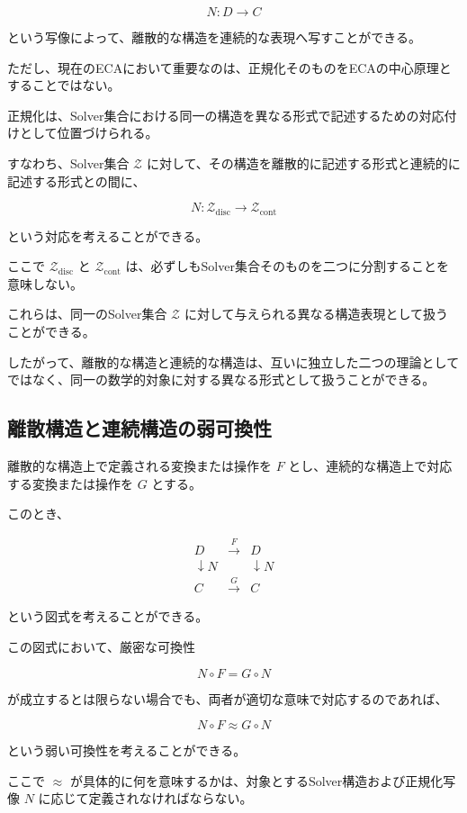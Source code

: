\[
N:D\longrightarrow C
\]

という写像によって、離散的な構造を連続的な表現へ写すことができる。

ただし、現在のECAにおいて重要なのは、正規化そのものをECAの中心原理とすることではない。

正規化は、Solver集合における同一の構造を異なる形式で記述するための対応付けとして位置づけられる。

すなわち、Solver集合 $\mathcal{Z}$ に対して、その構造を離散的に記述する形式と連続的に記述する形式との間に、

\[
N:
\mathcal{Z}_{\mathrm{disc}}
\longrightarrow
\mathcal{Z}_{\mathrm{cont}}
\]

という対応を考えることができる。

ここで $\mathcal{Z}_{\mathrm{disc}}$ と $\mathcal{Z}_{\mathrm{cont}}$ は、必ずしもSolver集合そのものを二つに分割することを意味しない。

これらは、同一のSolver集合 $\mathcal{Z}$ に対して与えられる異なる構造表現として扱うことができる。

したがって、離散的な構造と連続的な構造は、互いに独立した二つの理論としてではなく、同一の数学的対象に対する異なる形式として扱うことができる。

\subsection{離散構造と連続構造の弱可換性}

離散的な構造上で定義される変換または操作を $F$ とし、連続的な構造上で対応する変換または操作を $G$ とする。

このとき、

\[
\begin{array}{ccc}
D & \xrightarrow{F} & D \\
\downarrow N & & \downarrow N \\
C & \xrightarrow{G} & C
\end{array}
\]

という図式を考えることができる。

この図式において、厳密な可換性

\[
N\circ F
=
G\circ N
\]

が成立するとは限らない場合でも、両者が適切な意味で対応するのであれば、

\[
N\circ F
\approx
G\circ N
\]

という弱い可換性を考えることができる。

ここで $\approx$ が具体的に何を意味するかは、対象とするSolver構造および正規化写像 $N$ に応じて定義されなければならない。

